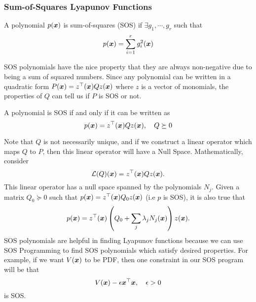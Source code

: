 \subsubsection{Sum-of-Squares Lyapunov Functions}
\begin{definition}
	A polynomial $p(\boldsymbol{x})$ is sum-of-squares (SOS) if $\exists g_1,\cdots,g_r$
	such that \[
		p(\boldsymbol{x}) = \sum_{i=1}^r g_i^2(\boldsymbol{x})
	\]
	\label{defn:sos}
\end{definition}
SOS polynomials have the nice property that they are always non-negative due to
being a sum of squared numbers. Since any polynomial can be written in a
quadratic form $P(\boldsymbol{x}) = z^\top(\boldsymbol{x}) Q z(\boldsymbol{x})$ where $z$ is a vector of
monomials, the properties of $Q$
can tell us if $P$ is SOS or not.
\begin{theorem}
	A polynomial is SOS if and only if it can be written as \[
		p(\boldsymbol{x}) = z^\top(\boldsymbol{x}) Q z(\boldsymbol{x}), \quad Q \succeq 0
	\]
	\label{thm:sos}
\end{theorem}
Note that $Q$ is not necessarily unique, and if we construct a linear operator
which maps $Q$ to $P$, then this linear operator will have a Null Space.
Mathematically, consider \[
	\mathcal{L}(Q)(\boldsymbol{x}) = z^\top(\boldsymbol{x})Qz(\boldsymbol{x}).
\]
This linear operator has a null space spanned by the polynomials $N_j$. Given a
matrix $Q_0 \succeq 0$ such that $p(\boldsymbol{x}) = z^\top(\boldsymbol{x})Q_0z(\boldsymbol{x})$ (i.e
$p$ is SOS), it is also true that \[
	p(\boldsymbol{x}) = z^\top(\boldsymbol{x})\left( Q_0 + \sum_{j} \lambda_j N_j(\boldsymbol{x}) \right)
	z(\boldsymbol{x}).
\]
SOS polynomials are helpful in finding Lyapunov functions because we can use SOS
Programming to find SOS polynomials which satisfy desired properties. For
example, if we want $V(\boldsymbol{x})$ to be PDF, then one constraint in our SOS program
will be that \[
	V(\boldsymbol{x}) - \epsilon \boldsymbol{x}^\top \boldsymbol{x}, \quad \epsilon > 0
\] is SOS.

